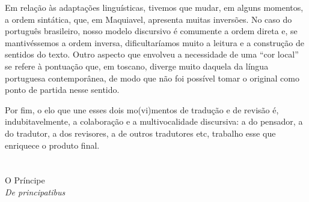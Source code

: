 Em relação às adaptações linguísticas, tivemos que mudar, em alguns
momentos, a ordem sintática, que, em Maquiavel, apresenta muitas
inversões. No caso do português brasileiro, nosso modelo discursivo é
comumente a ordem direta e, se mantivéssemos a ordem inversa,
dificultaríamos muito a leitura e a construção de sentidos do texto.
Outro aspecto que envolveu a necessidade de uma ``cor local'' se refere
à pontuação que, em toscano, diverge muito daquela da língua portuguesa
contemporânea, de modo que não foi possível tomar o original como ponto
de partida nesse sentido.

Por fim, o elo que une esses dois mo(vi)mentos de tradução e de revisão
é, indubitavelmente, a colaboração e a multivocalidade discursiva: a do
pensador, a do tradutor, a dos revisores, a de outros tradutores etc, 
trabalho esse que enriquece o produto final.

\enlargethispage{\textheight}

\chapter*{}
\begin{center}
\begin{vplace}[0.3]
\Large
O Príncipe\\
\textit{De principatibus}
\end{vplace}
\end{center}
\thispagestyle{empty}